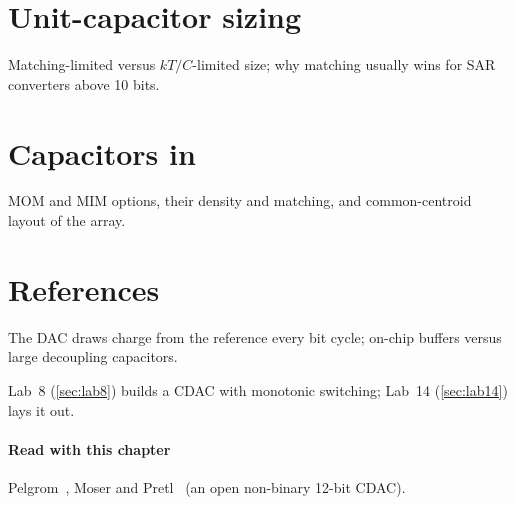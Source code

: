 \section{Unit-capacitor sizing}\label{sec:ch17-3}
Matching-limited versus $kT/C$-limited size; why matching usually wins for SAR converters above 10 bits.

\section{Capacitors in \texorpdfstring{\sgx{}}{SG13G2}}\label{sec:ch17-4}
MOM and MIM options, their density and matching, and common-centroid layout of the array.

\section{References}\label{sec:ch17-5}
The DAC draws charge from the reference every bit cycle; on-chip buffers versus large decoupling capacitors.

\begin{tryit}
Lab~8 (\cref{sec:lab8}) builds a CDAC with monotonic switching; Lab~14 (\cref{sec:lab14}) lays it out.
\end{tryit}

\paragraph{Read with this chapter} Pelgrom~\cite{pelgrom}, Moser and Pretl~\cite{jkusar} (an open non-binary 12-bit CDAC).
